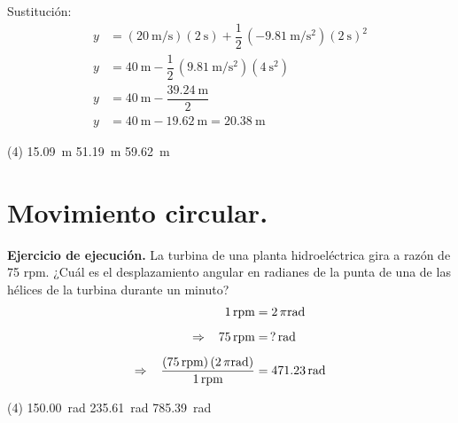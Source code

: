 \documentclass[12pt, letter]{exam}
\begin{document}
\begin{questions}
    Sustitución:
    \begin{align*}
    y &= \left( \displaystyle \SI[per-mode=fraction]{20}{\meter\per\second} \right) (\SI{2}{\second}) + \dfrac{1}{2} \, \left( \displaystyle -\SI[per-mode=fraction]{9.81}{\meter\per\square\second} \right) \left(\SI{2}{\second} \right)^{2} \\[0.5em]
    y &= \SI{40}{\meter} - \dfrac{1}{2} \, \left( \displaystyle \SI[per-mode=fraction]{9.81}{\meter\per\square\second} \right) \left(\SI{4}{\square\second} \right) \\[0.5em]
    y &= \SI{40}{\meter} - \dfrac{\SI{39.24}{\meter}}{2} \\[0.5em]
    y &= \SI{40}{\meter} - \SI{19.62}{\meter} = \SI{20.38}{\meter}
    \end{align*}
    \begin{tasks}(4)
        \task \SI{15.09}{\meter}
        \task {}
        \task \SI{51.19}{\meter}
        \task \SI{59.62}{\meter}
    \end{tasks}

    \section{Movimiento circular.}

    \setcounter{question}{11} \question \label{Ejercicio_07} \textbf{Ejercicio de ejecución. } La turbina de una planta hidroeléctrica gira a razón de 75 rpm. ¿Cuál es el desplazamiento angular en radianes de la punta de una de las hélices de la turbina durante un minuto?
    \begin{align*}
        1 \, \text{rpm} &= 2 \, \pi \unit{\radian} \\[0.5em]
        \Rightarrow \hspace{0.3cm} 75 \, \text{rpm} &= \, ? \, \unit{\radian} \\[0.5em]
        \Rightarrow \hspace{0.3cm} \dfrac{\left( 75 \, \text{rpm} \right) (2 \, \pi \unit{\radian})}{1 \, \text{rpm}} &= \SI{471.23}{\radian}
    \end{align*}
    \begin{tasks}(4)
        \task \SI{150.00}{\radian}
        \task \SI{235.61}{\radian}
        \task {}
        \task \SI{785.39}{\radian}
    \end{tasks}


\end{questions}
\end{document}
